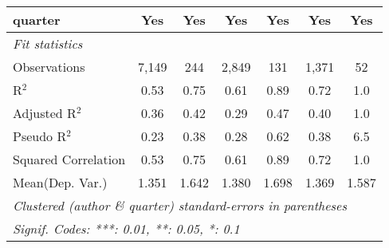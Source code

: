 \begin{tabular}{lcccccc}
   quarter                                                    & Yes           & Yes           & Yes           & Yes        & Yes            & Yes\\  
   \midrule
   \emph{Fit statistics}\\
   Observations                                               & 7,149         & 244           & 2,849         & 131        & 1,371          & 52\\  
   R$^2$                                                      & 0.53          & 0.75          & 0.61          & 0.89       & 0.72           & 1.0\\  
   Adjusted R$^2$                                             & 0.36          & 0.42          & 0.29          & 0.47       & 0.40           & 1.0\\  
   Pseudo R$^2$                                               & 0.23          & 0.38          & 0.28          & 0.62       & 0.38           & 6.5\\  
   Squared Correlation                                        & 0.53          & 0.75          & 0.61          & 0.89       & 0.72           & 1.0\\  
Mean(Dep. Var.) & 1.351 & 1.642 & 1.380 & 1.698 & 1.369 & 1.587 \\
   \midrule \midrule
   \multicolumn{7}{l}{\emph{Clustered (author \& quarter) standard-errors in parentheses}}\\
   \multicolumn{7}{l}{\emph{Signif. Codes: ***: 0.01, **: 0.05, *: 0.1}}\\
\end{tabular}
\par\endgroup
